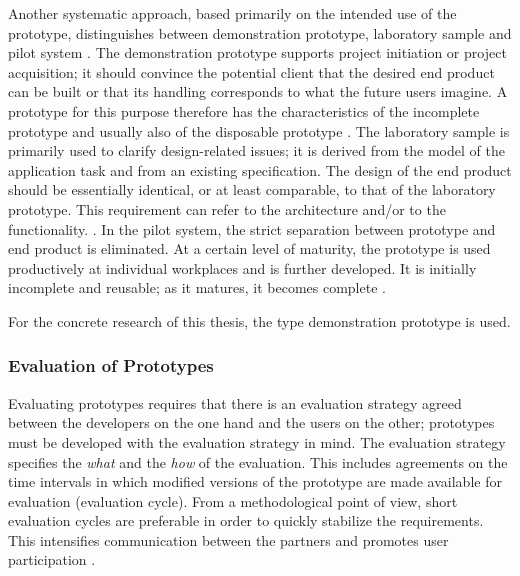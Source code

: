 Another systematic approach, based primarily on the intended use of the prototype, distinguishes between demonstration prototype, laboratory sample and pilot system
\autocite{riedlManagementInformatik2019}.
The demonstration prototype supports project initiation or project acquisition; it should convince the potential client that the desired end product can be built or that its handling corresponds to what the future users imagine. A prototype for this purpose therefore has the characteristics of the incomplete prototype and usually also of the disposable prototype
\autocite{riedlManagementInformatik2019}.
The laboratory sample is primarily used to clarify design-related issues; it is derived from the model of the application task and from an existing specification. The design of the end product should be essentially identical, or at least comparable, to that of the laboratory prototype. This requirement can refer to the architecture and/or to the functionality.
\autocite{riedlManagementInformatik2019}.
In the pilot system, the strict separation between prototype and end product is eliminated. At a certain level of maturity, the prototype is used productively at individual workplaces and is further developed. It is initially incomplete and reusable; as it matures, it becomes complete
\autocite{riedlManagementInformatik2019}.

%

For the concrete research of this thesis,
the type demonstration prototype is used.

\subsubsection*{Evaluation of Prototypes}

Evaluating prototypes requires that there is an evaluation strategy agreed between the developers on the one hand
and the users on the other; prototypes must be developed with the evaluation strategy in mind.
The evaluation strategy specifies the \textit{what} and the \textit{how} of the evaluation.
This includes agreements on the time intervals in which modified versions of the prototype are made available for evaluation (evaluation cycle).
From a methodological point of view, short evaluation cycles are preferable in order to quickly stabilize the requirements.
This intensifies communication between the partners and promotes user participation
\autocite{riedlManagementInformatik2019}.

